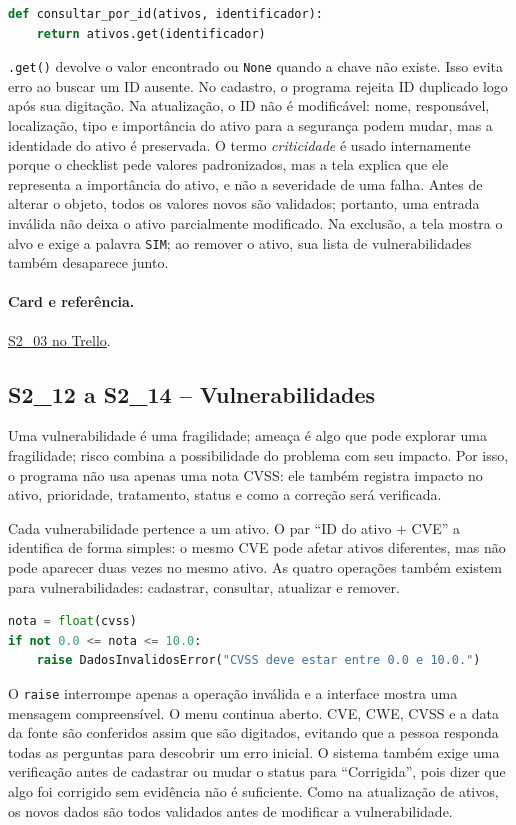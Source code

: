 \documentclass[11pt,a4paper]{article}
\newcommand{\referencia}[2]{\paragraph{Card e referência.}\href{#1}{#2}}
\newcommand{\cardsection}[1]{\Needspace{12\baselineskip}\subsection{#1}}
\begin{document}
\begin{lstlisting}[language=Python,caption={Busca direta pela chave do dicionário}]
def consultar_por_id(ativos, identificador):
    return ativos.get(identificador)
\end{lstlisting}

\texttt{.get()} devolve o valor encontrado ou \texttt{None} quando a chave não existe. Isso evita erro ao buscar um ID ausente. No cadastro, o programa rejeita ID duplicado logo após sua digitação. Na atualização, o ID não é modificável: nome, responsável, localização, tipo e importância do ativo para a segurança podem mudar, mas a identidade do ativo é preservada. O termo \emph{criticidade} é usado internamente porque o checklist pede valores padronizados, mas a tela explica que ele representa a importância do ativo, e não a severidade de uma falha. Antes de alterar o objeto, todos os valores novos são validados; portanto, uma entrada inválida não deixa o ativo parcialmente modificado. Na exclusão, a tela mostra o alvo e exige a palavra \texttt{SIM}; ao remover o ativo, sua lista de vulnerabilidades também desaparece junto.

\referencia{https://trello.com/c/NdgkJaYg}{S2\_03 no Trello}.

\cardsection{S2\_12 a S2\_14 -- Vulnerabilidades}

Uma vulnerabilidade é uma fragilidade; ameaça é algo que pode explorar uma fragilidade; risco combina a possibilidade do problema com seu impacto. Por isso, o programa não usa apenas uma nota CVSS: ele também registra impacto no ativo, prioridade, tratamento, status e como a correção será verificada.

Cada vulnerabilidade pertence a um ativo. O par ``ID do ativo + CVE'' a identifica de forma simples: o mesmo CVE pode afetar ativos diferentes, mas não pode aparecer duas vezes no mesmo ativo. As quatro operações também existem para vulnerabilidades: cadastrar, consultar, atualizar e remover.

\begin{lstlisting}[language=Python,caption={Validação simples do CVSS}]
nota = float(cvss)
if not 0.0 <= nota <= 10.0:
    raise DadosInvalidosError("CVSS deve estar entre 0.0 e 10.0.")
\end{lstlisting}

O \texttt{raise} interrompe apenas a operação inválida e a interface mostra uma mensagem compreensível. O menu continua aberto. CVE, CWE, CVSS e a data da fonte são conferidos assim que são digitados, evitando que a pessoa responda todas as perguntas para descobrir um erro inicial. O sistema também exige uma verificação antes de cadastrar ou mudar o status para ``Corrigida'', pois dizer que algo foi corrigido sem evidência não é suficiente. Como na atualização de ativos, os novos dados são todos validados antes de modificar a vulnerabilidade.
\end{document}

